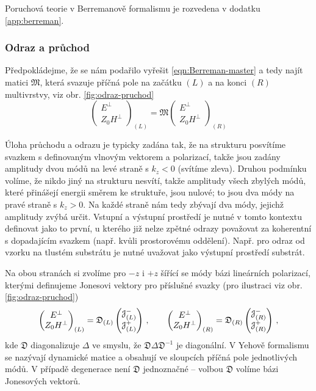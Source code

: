 Poruchová teorie v Berremanově formalismu je rozvedena v dodatku \ref{app:berreman}.

\subsubsection*{Odraz a průchod}

Předpokládejme, že se nám podařilo vyřešit \eqref{eqn:Berreman-master} a tedy najít matici $\mathfrak{M}$, která svazuje příčná pole na začátku $(L)$ a na konci $(R)$ multivrstvy, viz obr. \ref{fig:odraz-pruchod}
\begin{equation}
    \begin{pmatrix} E^\perp \\ Z_0 H^\perp \end{pmatrix}_{(L)}=\mathfrak{M} \begin{pmatrix} E^\perp \\ Z_0 H^\perp \end{pmatrix}_{(R)}
\end{equation}


Úloha průchodu a odrazu je typicky zadána tak, že na strukturu posvítíme svazkem s definovaným vlnovým vektorem a polarizací, takže jsou zadány amplitudy dvou módů na levé straně s $k_z < 0$ (svítíme zleva).
Druhou podmínku volíme, že nikdo jiný na strukturu nesvítí, takže amplitudy všech zbylých módů, které přinášejí energii směrem ke struktuře, jsou nulové; to jsou dva módy na pravé straně s $k_z > 0$.
Na každé straně nám tedy zbývají dva módy, jejichž amplitudy zvýbá určit.
Vstupní a výstupní prostředí je nutné v tomto kontextu definovat jako to první, u kterého již nelze zpětné odrazy považovat za koherentní s dopadajícím svazkem (např. kvůli prostorovému oddělení).
Např. pro odraz od vzorku na tlustém substrátu je nutné uvažovat jako výstupní prostředí substrát.

Na obou stranách si zvolíme pro $-z$ i $+z$ šířící se módy bázi lineárních polarizací, kterými definujeme Jonesovi vektory pro příslušné svazky (pro ilustraci viz obr. \ref{fig:odraz-pruchod})
\begin{equation}
    \begin{pmatrix} E^\perp \\ Z_0 H^\perp \end{pmatrix}_{(L)}=\mathfrak{D}_{(L)} \begin{pmatrix} \mathcal{J}^-_{(L)} \\ \mathcal{J}^+_{(L)} \end{pmatrix} \,, \qquad
    \begin{pmatrix} E^\perp \\ Z_0 H^\perp \end{pmatrix}_{(R)}=\mathfrak{D}_{(R)} \begin{pmatrix} \mathcal{J}^-_{(R)} \\ \mathcal{J}^+_{(R)} \end{pmatrix} \,,
\end{equation}
kde $\mathfrak{D}$ diagonalizuje $\Delta$ ve smyslu, že $\mathfrak{D}\Delta \mathfrak{D}^{-1}$ je diagonální.
V Yehově formalismu se nazývají dynamické matice a obsahují ve sloupcích příčná pole jednotlivých módů.
V případě degenerace není $\mathfrak{D}$ jednoznačné -- volbou $\mathfrak{D}$ volíme bázi Jonesových vektorů.

